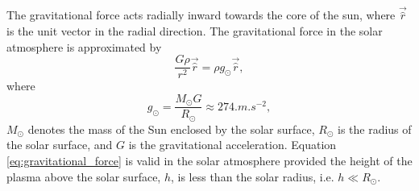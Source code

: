 The gravitational force acts radially inward towards the core of the sun, where $\vec{\hat{r}}$ is the unit vector in the radial direction. The gravitational force in the solar atmosphere is approximated by
\begin{equation}
    \label{eq:gravitational_force}
    \frac{G\rho}{r^2}\vec{\hat{r}} = \rho g_\odot \vec{\hat{r}},
\end{equation}
where
\begin{equation}
    \label{eq:gravitational_acceleration}
    g_\odot=\frac{M_\odot G}{R_\odot}\approx274\si{.m.s^{-2}},
\end{equation}
$M_\odot$ denotes the mass of the Sun enclosed by the solar surface, $R_\odot$ is the radius of the solar surface, and $G$ is the gravitational acceleration. Equation \eqref{eq:gravitational_force} is valid in the solar atmosphere provided the height of the plasma above the solar surface, $h$, is less than the solar radius, i.e. $h\ll R_\odot$.

